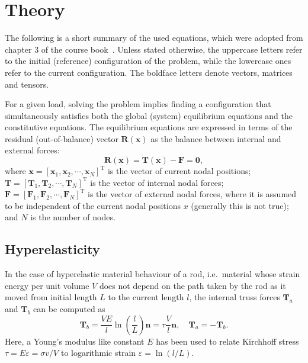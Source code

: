 \section{Theory}
\label{sec:theory}

The following is a short summary of the used equations, which were adopted
from chapter 3 of the course book~\cite{Bonet2008}.
Unless stated otherwise, the uppercase letters refer to the initial (reference)
configuration of the problem, while the lowercase ones refer to the current
configuration. The boldface letters denote vectors, matrices and tensors.

For a given load, solving the problem implies finding a configuration that
simultaneously satisfies both the global (system) equilibrium equations and
the constitutive equations.
The equilibrium equations are expressed in terms of the residual (out-of-balance)
vector \(\bm{R} (\bm{x})\) as the balance between internal and external forces:
\begin{equation}
  \bm{R} (\bm{x}) = \bm{T} (\bm{x}) - \bm{F} = \bm{0},
\end{equation}
where \(\bm{x} =\left[ \bm{x}_{1}, \bm{x}_{2}, \cdots, \bm{x}_{N} \right]^{\text{T}}\)
is the vector of current nodal positions;
\(\bm{T} =\left[ \bm{T}_{1}, \bm{T}_{2}, \cdots, \bm{T}_{N} \right]^{\text{T}}\) is
the vector of internal nodal forces;
\(\bm{F} =\left[ \bm{F}_{1}, \bm{F}_{2}, \cdots, \bm{F}_{N} \right]^{\text{T}}\) is
the vector of external nodal forces, where it is assumed to be independent
of the current nodal positions \(x\) (generally this is not true);
and \(N\) is the number of nodes.

\subsection{Hyperelasticity}
\label{sec:hyperelasticity}

In the case of hyperelastic material behaviour of a rod, i.e.\ material whose
strain energy per unit volume \(V\) does not depend on the path taken by the rod as
it moved from initial length \(L\) to the current length \(l\), the internal
truss forces \(\bm{T}_{a}\) and \(\bm{T}_{b}\) can be computed as
\begin{equation}
  \bm{T}_{b} = \frac{V E}{l} \ln \left( \frac{l}{L} \right) \bm{n}
             = \tau \frac{V}{l} \bm{n}, \quad
  \bm{T}_{a} = - \bm{T}_{b}.
\end{equation}
Here, a Young's modulus like constant \(E\) has been used to relate Kirchhoff
stress \(\tau = E \varepsilon = \sigma v / V\) to logarithmic strain
\(\varepsilon = \ln(l/L)\).

